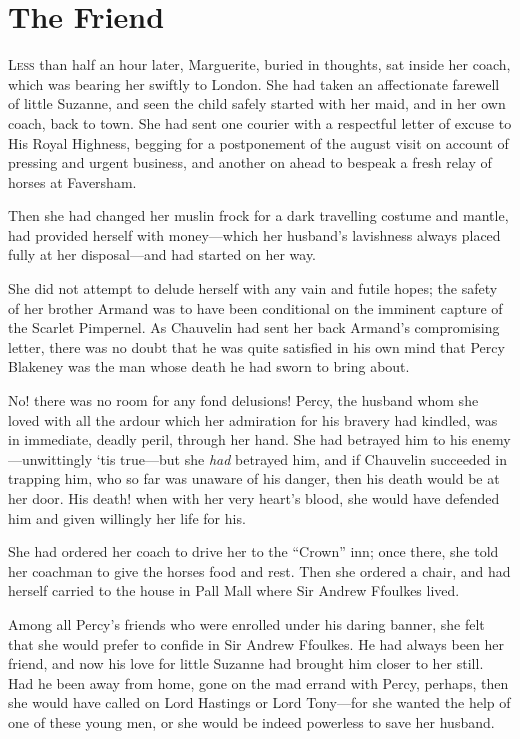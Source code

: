 

\chapter{The Friend}
\lettrine[lines=4]{L}{ess} than half an hour later, Marguerite, buried in thoughts, sat inside her coach, which was bearing her swiftly to London. She had taken an affectionate farewell of little Suzanne, and seen the child safely started with her maid, and in her own coach, back to town. She had sent one courier with a respectful letter of excuse to His Royal Highness, begging for a postponement of the august visit on account of pressing and urgent business, and another on ahead to bespeak a fresh relay of horses at Faversham.

Then she had changed her muslin frock for a dark travelling costume and mantle, had provided herself with money---which her husband's lavishness always placed fully at her disposal---and had started on her way.

She did not attempt to delude herself with any vain and futile hopes; the safety of her brother Armand was to have been conditional on the imminent capture of the Scarlet Pimpernel. As Chauvelin had sent her back Armand's compromising letter, there was no doubt that he was quite satisfied in his own mind that Percy Blakeney was the man whose death he had sworn to bring about.

No! there was no room for any fond delusions! Percy, the husband whom she loved with all the ardour which her admiration for his bravery had kindled, was in immediate, deadly peril, through her hand. She had betrayed him to his enemy---unwittingly `tis true---but she \textit{had} betrayed him, and if Chauvelin succeeded in trapping him, who so far was unaware of his danger, then his death would be at her door. His death! when with her very heart's blood, she would have defended him and given willingly her life for his.

She had ordered her coach to drive her to the \enquote{Crown} inn; once there, she told her coachman to give the horses food and rest. Then she ordered a chair, and had herself carried to the house in Pall Mall where Sir Andrew Ffoulkes lived.

Among all Percy's friends who were enrolled under his daring banner, she felt that she would prefer to confide in Sir Andrew Ffoulkes. He had always been her friend, and now his love for little Suzanne had brought him closer to her still. Had he been away from home, gone on the mad errand with Percy, perhaps, then she would have called on Lord Hastings or Lord Tony---for she wanted the help of one of these young men, or she would be indeed powerless to save her husband.

